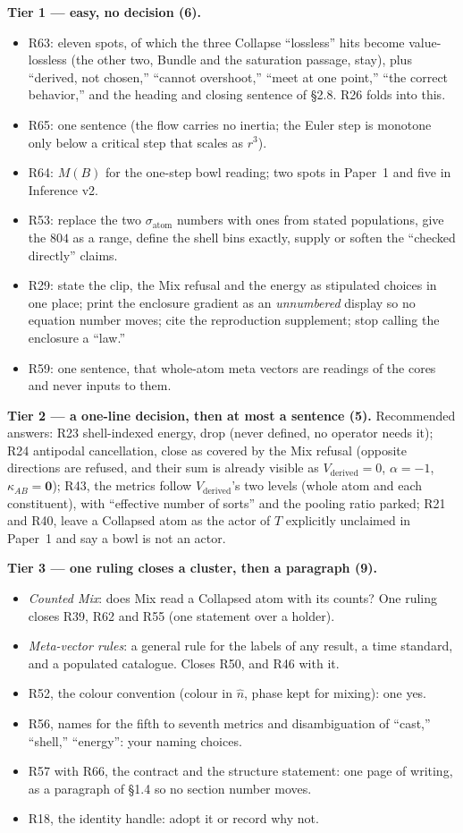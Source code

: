 \documentclass[11pt]{article}
\begin{document}
\textbf{Tier 1 --- easy, no decision (6).}
\begin{itemize}
\item R63: eleven spots, of which the three Collapse ``lossless'' hits become value-lossless (the other two, Bundle and the saturation passage, stay), plus ``derived, not chosen,''
``cannot overshoot,'' ``meet at one point,'' ``the correct behavior,'' and the heading and closing sentence of \S2.8. R26 folds into this.
\item R65: one sentence (the flow carries no inertia; the Euler step is monotone only below a critical step that scales as $r^3$).
\item R64: $M(B)$ for the one-step bowl reading; two spots in Paper~1 and five in Inference v2.
\item R53: replace the two $\sigma_{\text{atom}}$ numbers with ones from stated populations, give the $804$ as a range, define the shell bins exactly, supply or soften the
``checked directly'' claims.
\item R29: state the clip, the Mix refusal and the energy as stipulated choices in one place; print the enclosure gradient as an \emph{unnumbered} display so no equation number moves; cite the
reproduction supplement; stop calling the enclosure a ``law.''
\item R59: one sentence, that whole-atom meta vectors are readings of the cores and never inputs to them.
\end{itemize}

\textbf{Tier 2 --- a one-line decision, then at most a sentence (5).} Recommended answers:
R23 shell-indexed energy, drop (never defined, no operator needs it); R24 antipodal cancellation, close as covered by the Mix refusal (opposite directions are
refused, and their sum is already visible as $V_{\text{derived}}=0$, $\alpha=-1$, $\kappa_{AB}=\mathbf 0$); R43, the metrics follow $V_{\text{derived}}$'s two levels
(whole atom and each constituent), with ``effective number of sorts'' and the pooling ratio parked; R21 and R40, leave a Collapsed atom as the actor of $T$ explicitly unclaimed in Paper~1
and say a bowl is not an actor.

\textbf{Tier 3 --- one ruling closes a cluster, then a paragraph (9).}
\begin{itemize}
\item \emph{Counted Mix}: does Mix read a Collapsed atom with its counts? One ruling closes R39, R62 and R55 (one statement over a holder).
\item \emph{Meta-vector rules}: a general rule for the labels of any result, a time standard, and a populated catalogue. Closes R50, and R46 with it.
\item R52, the colour convention (colour in $\hat n$, phase kept for mixing): one yes.
\item R56, names for the fifth to seventh metrics and disambiguation of ``cast,'' ``shell,'' ``energy'': your naming choices.
\item R57 with R66, the contract and the structure statement: one page of writing, as a paragraph of \S1.4 so no section number moves.
\item R18, the identity handle: adopt it or record why not.
\end{itemize}
\end{document}
